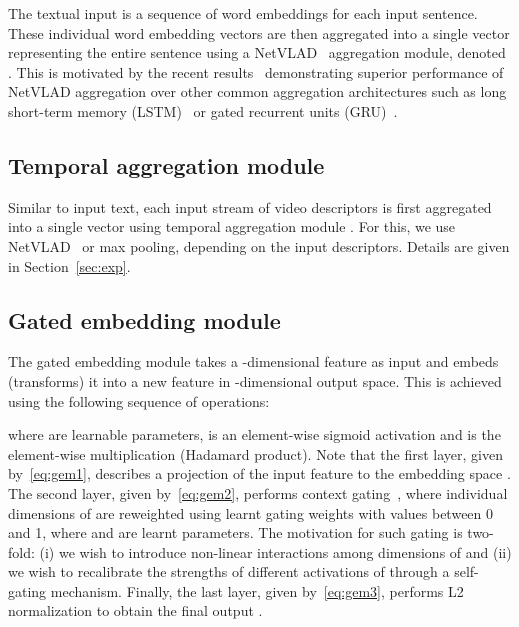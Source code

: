 \documentclass[runningheads]{llncs}
\begin{document}
The textual input is a sequence of word embeddings for each input sentence. These individual word embedding vectors are then aggregated into a single vector representing the entire sentence using a NetVLAD~\cite{arandjelovic16netvlad} aggregation module, denoted .  This is motivated by the recent results~\cite{miech17learnable} demonstrating superior performance of NetVLAD aggregation over other common aggregation architectures such as long short-term memory (LSTM)~\cite{hochreiter97lstm} or gated recurrent units (GRU)~\cite{cho11GRU}. 


\subsection{Temporal aggregation module}

Similar to input text, each input stream  of video descriptors is first aggregated into a single vector using temporal aggregation module . For this, we use NetVLAD~\cite{arandjelovic16netvlad} or max pooling, depending on the input descriptors. Details are given in Section~\ref{sec:exp}.  

 


\subsection{Gated embedding module} \label{sec:gated-embd}
The gated embedding module  takes a -dimensional feature  as input and embeds (transforms) it into a new feature  in -dimensional output space.
This is achieved using the following sequence of operations:



where  are  learnable parameters,  is an element-wise sigmoid activation and  is the element-wise multiplication (Hadamard product). Note that the first layer, given by~\eqref{eq:gem1}, describes a projection of the input feature  to the embedding space . The second layer, given by~\eqref{eq:gem2}, performs context gating~\cite{miech17learnable}, where individual dimensions of  are reweighted using learnt gating weights  with values between 0 and 1, where   and  are learnt parameters. The motivation for such gating is two-fold: (i) we wish to introduce non-linear interactions among dimensions of  and (ii) we wish to recalibrate the strengths of different activations of  through a self-gating mechanism.
Finally, the last layer, given by~\eqref{eq:gem3}, performs L2 normalization to obtain the final output .
\end{document}
